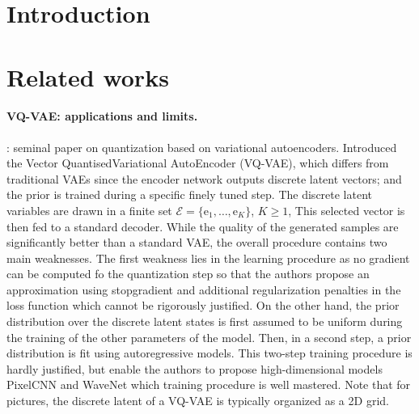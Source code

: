 \documentclass{article}
\title{}
\date{}
\author[$\dag$]{XXX}
\affil[$\dag$]{{\small CMAP, \'Ecole Polytechnique, Institut Polytechnique de Paris, Palaiseau.}}
\newcommand{\rme}{\mathrm{e}}
\begin{document}
\maketitle

\begin{abstract}

\end{abstract}

\section{Introduction}

\section{Related works}
\paragraph{VQ-VAE: applications and limits.}
\cite{oord2017neural}: seminal paper on quantization based on  variational autoencoders. Introduced the  Vector QuantisedVariational AutoEncoder (VQ-VAE), which differs from traditional VAEs since the
encoder network outputs discrete latent vectors; and the prior is trained during a specific finely tuned step. The discrete latent variables are drawn in a finite set $\mathcal{E} = \{\rme_1,\ldots,\rme_K\}$, $K\geq 1$, This selected vector is then fed to a standard decoder. While the quality of the generated samples are significantly better than a standard VAE, the overall procedure contains two main weaknesses. The first weakness lies in the learning procedure as no gradient can be computed fo the quantization step so that the authors propose an approximation using stopgradient and additional regularization penalties in the loss function which cannot be rigorously justified. On the other hand, the prior distribution over the discrete latent states is first assumed to be uniform during the training of the other parameters of the model. Then, in a second step, a prior distribution is fit using autoregressive models. This two-step training procedure is hardly justified, but enable the authors to propose high-dimensional models PixelCNN and WaveNet which training procedure is well mastered. Note that for pictures, the discrete latent of a VQ-VAE is typically organized as a 2D grid.
\end{document}
